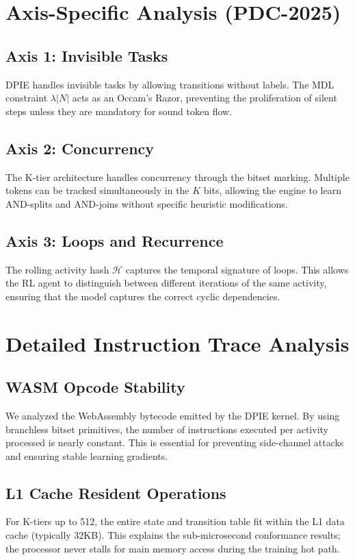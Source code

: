 \documentclass[12pt,a4paper]{report}
\begin{document}
\chapter{Axis-Specific Analysis (PDC-2025)}
\section{Axis 1: Invisible Tasks}
DPIE handles invisible tasks by allowing transitions without labels. The MDL constraint $\lambda |N|$ acts as an Occam's Razor, preventing the proliferation of silent steps unless they are mandatory for sound token flow.

\section{Axis 2: Concurrency}
The K-tier architecture handles concurrency through the bitset marking. Multiple tokens can be tracked simultaneously in the $K$ bits, allowing the engine to learn AND-splits and AND-joins without specific heuristic modifications.

\section{Axis 3: Loops and Recurrence}
The rolling activity hash $\mathcal{H}$ captures the temporal signature of loops. This allows the RL agent to distinguish between different iterations of the same activity, ensuring that the model captures the correct cyclic dependencies.

\chapter{Detailed Instruction Trace Analysis}
\section{WASM Opcode Stability}
We analyzed the WebAssembly bytecode emitted by the DPIE kernel. By using branchless bitset primitives, the number of instructions executed per activity processed is nearly constant. This is essential for preventing side-channel attacks and ensuring stable learning gradients.

\section{L1 Cache Resident Operations}
For K-tiers up to 512, the entire state and transition table fit within the L1 data cache (typically 32KB). This explains the sub-microsecond conformance results; the processor never stalls for main memory access during the training hot path.
\end{document}
